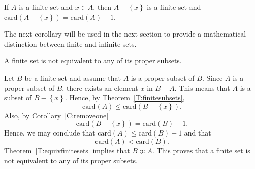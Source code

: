 \begin{corollary} \label{C:removeone}
If $A$ is a finite set and $x \in A$, then $A - \left\{ x \right\}$ is a finite set and  
$\text{card} \!\left( A - \left\{ x \right\} \right) = \text{card} ( A ) - 1$.
\end{corollary}
%
The next corollary will be used in the next section to provide a mathematical distinction between finite and infinite sets.
\begin{corollary} \label{C:propersubsets}
A finite set is not equivalent to any of its proper subsets.
\end{corollary}
%
\begin{myproof}
Let $B$ be a finite set and assume that $A$ is a proper subset of $B$.  Since $A$ is a proper subset of $B$, there exists an element $x$ in $B - A$.  This means that $A$ is a subset of 
$B - \left\{ x \right\}$.  Hence, by Theorem~\ref{T:finitesubsets},
\[
\text{card} ( A ) \leq \text{card} \!\left( B - \left\{ x \right\} \right).
\]
Also, by Corollary~\ref{C:removeone}
\[
\text{card} \!\left( B - \left\{ x \right\} \right) = \text{card} ( B ) - 1.
\]
Hence, we may conclude that $\text{card} ( A ) \leq \text{card} ( B ) - 1$ and that 
\[
\text{card} ( A ) < \text{card} ( B ).
\]
Theorem~\ref{T:equivfinitesets}
implies that $B \not \approx A$.  This proves that a finite set is not equivalent to any of its proper subsets.
\end{myproof}
\hbreak

\endinput
